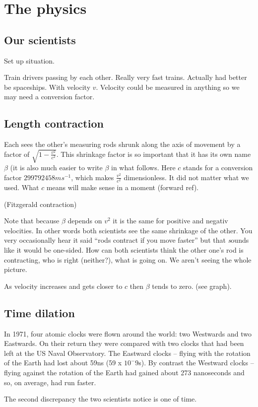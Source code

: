 \documentclass[main.tex]{subfiles}
\begin{document}
\section{The physics}
\subsection{Our scientists}
Set up situation.

Train drivers passing by each other. Really very fast trains. Actually had better be spaceships. With velocity $v$. Velocity could be measured in anything so we may need a conversion factor.

\subsection{Length contraction}
Each sees the other's measuring rods shrunk along the axis of movement by a factor of $\sqrt{1-\frac{v^2}{c^2}}$. This shrinkage factor is so important that it has its own name $\beta$ (it is also much easier to write $\beta$ in what follows. Here $c$ stands for a conversion factor $299792458ms^{-1}$, which makes $\frac{v^2}{c^2}$ dimensionless. It did not matter what we used. What $c$ means will make sense in a moment (forward ref).

(Fitzgerald contraction)

Note that because $\beta$ depends on $v^2$ it is the same for positive and negativ velocities. In other words both scientists see the same shrinkage of the other. You very occasionally hear it said ``rods contract if you move faster'' but that {\emph sounds} like it would be one-sided. How can both scientists think the other one's rod is contracting, who is right (neither?), what is going on. We aren't seeing the whole picture.

As velocity increases and gets closer to $c$ then $\beta$ tends to zero. (see graph). 

\subsection{Time dilation}
In 1971, four atomic clocks were flown around the world: two Westwards and two Eastwards. On their return they were compared with two clocks that had been left at the US Naval Observatory. The Eastward clocks -- flying with the rotation of the Earth had lost about 59ns (59 x $10^-9$s). By contrast the Westward clocks -- flying against the rotation of the Earth had gained about 273 nanoseconds and so, on average, had run faster.

The second discrepancy the two scientists notice is one of time. 
\end{document}
